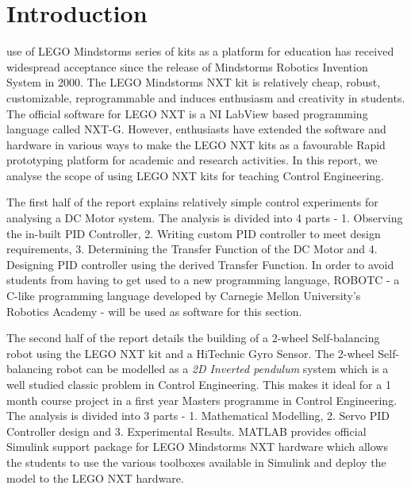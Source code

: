 \documentclass[a4paper,10pt]{article}
\begin{document}
\section{Introduction}
% 
% 
% 
% 
 use of LEGO Mindstorms series of kits as a platform for education has received widespread acceptance since the release of Mindstorms Robotics Invention System in 2000. The LEGO Mindstorms NXT kit is relatively cheap, robust, customizable, reprogrammable and induces enthusiasm and creativity in students. The official software for LEGO NXT is a NI LabView based programming language called NXT-G. However, enthusiasts have extended the software and hardware in various ways to make the LEGO NXT kits as a favourable Rapid prototyping platform for academic and research activities. In this report, we analyse the scope of using LEGO NXT kits for teaching Control Engineering. 

The first half of the report explains relatively simple control experiments for analysing a DC Motor system. The analysis is divided into 4 parts - 1. Observing the in-built PID Controller, 2. Writing custom PID controller to meet design requirements, 3. Determining the Transfer Function of the DC Motor and 4. Designing PID controller using the derived Transfer Function. In order to avoid students from having to get used to a new programming language, ROBOTC - a C-like programming language developed by Carnegie Mellon University's Robotics Academy - will be used as software for this section. 

The second half of the report details the building of a 2-wheel Self-balancing robot using the LEGO NXT kit and a HiTechnic Gyro Sensor. The 2-wheel Self-balancing robot can be modelled as a \emph{2D Inverted pendulum} system which is a well studied classic problem in Control Engineering. This makes it ideal for a 1 month course project in a first year Masters programme in Control Engineering. The analysis is divided into 3 parts - 1. Mathematical Modelling, 2. Servo PID Controller design and 3. Experimental Results. MATLAB provides official Simulink support package for LEGO Mindstorms NXT hardware which allows the students to use the various toolboxes available in Simulink and deploy the model to the LEGO NXT hardware.
\end{document}
